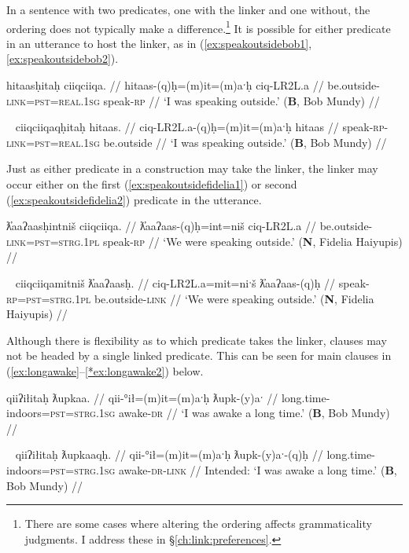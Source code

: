 In a sentence with two predicates, one with the linker and one without, the ordering does not typically make a difference.\footnote{There are some cases where altering the ordering affects grammaticality judgments. I address these in \S\ref{ch:link:preferences}.} It is possible for either predicate in an utterance to host the linker, as in (\ref{ex:speakoutsidebob1}, \ref{ex:speakoutsidebob2}).

\ex \label{ex:speakoutsidebob1}
\begingl
\glpreamble hitaasḥitaḥ ciiqciiqa. //
\gla hitaas-(q)ḥ=(m)it=(m)aˑḥ ciq-LR2L.a //
\glb be.outside-\textsc{link}=\textsc{pst}=\textsc{real.1sg} speak-\textsc{rp} //
\glft `I was speaking outside.' (\textbf{B}, Bob Mundy) //
\endgl
\xe

\ex~ \label{ex:speakoutsidebob2}
\begingl
\glpreamble ciiqciiqaqḥitaḥ hitaas. //
\gla ciq-LR2L.a-(q)ḥ=(m)it=(m)aˑḥ  hitaas  //
\glb speak-\textsc{rp}-\textsc{link}=\textsc{pst}=\textsc{real.1sg} be.outside //
\glft `I was speaking outside.' (\textbf{B}, Bob Mundy) //
\endgl
\xe

Just as either predicate in a construction may take the linker, the linker may occur either on the first (\ref{ex:speakoutsidefidelia1}) or second (\ref{ex:speakoutsidefidelia2}) predicate in the utterance.

\ex \label{ex:speakoutsidefidelia1}
\begingl
\glpreamble ƛ̓aaʔaasḥintniš ciiqciiqa. //
\gla ƛ̓aaʔaas-(q)ḥ=int=niš ciq-LR2L.a //
\glb be.outside-\textsc{link}=\textsc{pst}=\textsc{strg.1pl} speak-\textsc{rp} //
\glft `We were speaking outside.' (\textbf{N}, Fidelia Haiyupis) //
\endgl
\xe

\ex~ \label{ex:speakoutsidefidelia2}
\begingl
\glpreamble ciiqciiqamitniš ƛ̓aaʔaasḥ. //
\gla ciq-LR2L.a=mit=niˑš ƛ̓aaʔaas-(q)ḥ //
\glb speak-\textsc{rp}=\textsc{pst}=\textsc{strg.1pl} be.outside-\textsc{link} //
\glft `We were speaking outside.' (\textbf{N}, Fidelia Haiyupis) //
\endgl
\xe

Although there is flexibility as to which predicate takes the linker, clauses may not be headed by a single linked predicate. This can be seen for main clauses in (\ref{ex:longawake}--\ref{*ex:longawake2}) below.

\ex \label{ex:longawake}
\begingl
\glpreamble qiiʔiłitaḥ ƛupkaa. //
\gla qii-°ił=(m)it=(m)aˑḥ ƛupk-(y)aˑ //
\glb long.time-indoors=\textsc{pst}=\textsc{strg.1sg} awake-\textsc{dr} //
\glft `I was awake a long time.' (\textbf{B}, Bob Mundy) //
\endgl
\xe

\ex~ \label{*ex:longawake1}
\begingl
\glpreamble *qiiʔiłitaḥ ƛupkaaqḥ. //
\gla qii-°ił=(m)it=(m)aˑḥ ƛupk-(y)aˑ-(q)ḥ //
\glb long.time-indoors=\textsc{pst}=\textsc{strg.1sg} awake-\textsc{dr}-\textsc{link} //
\glft Intended: `I was awake a long time.' (\textbf{B}, Bob Mundy) //
\endgl
\xe

